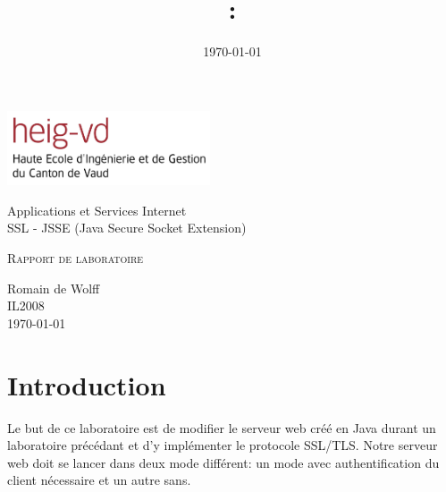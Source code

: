 \documentclass[10pt,a4paper,titlepage]{article}
\author{\auteurOne}
\title{\branchetag : \laboname}
\date{\today}
\newcommand{\branche}{Applications et Services Internet}
\newcommand{\laboname}{SSL - JSSE (Java Secure Socket Extension)}
\newcommand{\auteurOne}{Romain de Wolff}
\newcommand{\promo}{IL2008}
\newcommand{\titreDocument}{Rapport de laboratoire}
\begin{document}
\pagestyle{headings}
\begin{titlepage}
	\begin{center}

		\includegraphics[width=6cm]{img/HEIG-VD.jpg}

		\vspace{3cm}
		\LARGE \branche %
		\vspace{3cm}\\
		\Huge \laboname \\
		\vspace{3cm}

		\Large \textsc{\titreDocument} \\
		\vspace{3cm}

		\large \auteurOne \\
		\vspace{10pt}
		\normalsize \textsc{\promo} \\
		\vspace{1cm}
		\today
	\end{center}
\end{titlepage}

\tableofcontents
\newpage
\pagestyle{fancy}
 
\section{Introduction}

Le but de ce laboratoire est de modifier le serveur web créé en Java durant un laboratoire précédant et d'y implémenter le protocole SSL/TLS. Notre serveur web doit se lancer dans deux mode différent: un mode avec authentification du client nécessaire et un autre sans. 
\end{document}
